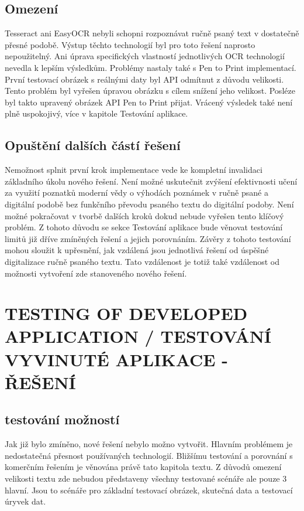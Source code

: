 \documentclass[journal]{IEEEtran}
\begin{document}
\subsection{Omezení}
Tesseract ani EasyOCR nebyli schopni rozpoznávat ručně psaný text v dostatečně přesné podobě.
Výstup těchto technologií byl pro toto řešení naprosto nepoužitelný.
Ani úprava specifických vlastností jednotlivých \ac{OCR} technologií nevedla k lepším výsledkům.
Problémy nastaly také s Pen to Print implementací.
První testovací obrázek s reálnými daty byl \ac{API} odmítnut z důvodu velikosti.
Tento problém byl vyřešen úpravou obrázku s cílem snížení jeho velikost.
Posléze byl takto upravený obrázek \ac{API} Pen to Print přijat.
Vrácený výsledek také není plně uspokojivý, více v kapitole Testování aplikace.

\subsection{Opuštění dalších částí řešení}
Nemožnost splnit první krok implementace vede ke kompletní invalidaci základního úkolu nového řešení.
Není možné uskutečnit zvýšení efektivnosti učení za využití poznatků moderní vědy o výhodách poznámek v ručně psané a digitální podobě bez funkčního převodu psaného textu do digitální podoby.
Není možné pokračovat v tvorbě dalších kroků dokud nebude vyřešen tento klíčový problém.
Z tohoto důvodu se  sekce Testování aplikace bude věnovat testování limitů již dříve zmíněných řešení a jejich porovnáním.
Závěry z tohoto testování mohou sloužit k upřesnění, jak vzdálená jsou jednotlivá řešení od úspěšné digitalizace ručně psaného textu.
Tato vzdálenost je totiž také vzdálenost od možnosti vytvoření zde stanoveného nového řešení.


\section{TESTING OF DEVELOPED APPLICATION / TESTOVÁNÍ VYVINUTÉ APLIKACE - ŘEŠENÍ}

\subsection{testování možností}
Jak již bylo zmíněno, nové řešení nebylo možno vytvořit.
Hlavním problémem je nedostatečná přesnost používaných technologií.
Bližšímu testování a porovnání s komerčním řešením je věnována právě tato kapitola textu.
Z důvodů omezení velikosti textu zde nebudou představeny všechny testované scénáře ale pouze 3 hlavní.
Jsou to scénáře pro základní testovací obrázek, skutečná data a testovací úryvek dat.
\end{document}
